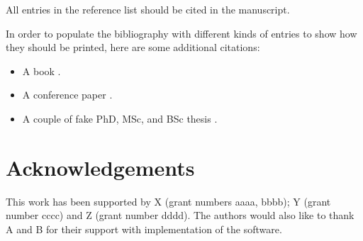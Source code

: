 \documentclass{modelica}
\begin{document}
All entries in the reference list should be cited in the manuscript.

In order to populate the bibliography with different kinds of entries to show how they should be printed, here are some additional citations:

\begin{itemize}
\item A book \cite{Kernighan:1988}.
\item A conference paper \cite{colaco:2003}.
\item A couple of fake PhD, MSc, and BSc thesis \cite{Doe:PhD,Doe:MSc,Doe:BSc}.
\end{itemize}

\section*{Acknowledgements}

This work has been supported by X (grant numbers aaaa, bbbb); Y (grant number cccc) and Z (grant number dddd).
The authors would also like to thank A and B for their support with implementation of the software.

\printbibliography
\end{document}

